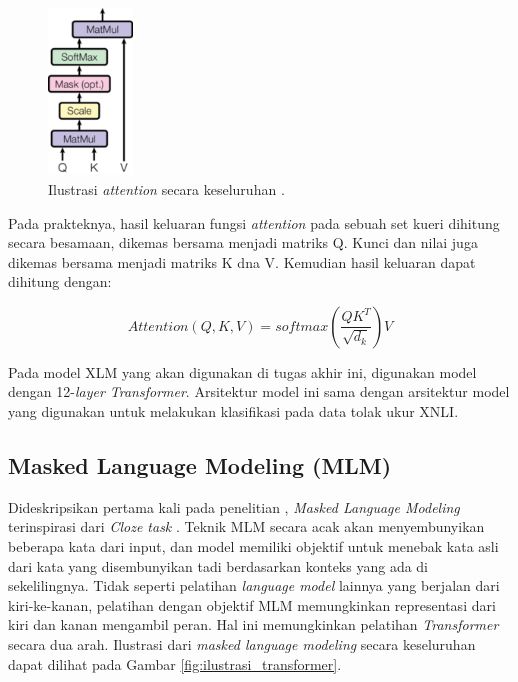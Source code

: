     \begin{figure}[ht]
        \centering
        \includegraphics[width=0.2\textwidth]{resources/overview-attention.png}
        \caption{Ilustrasi \textit{attention} secara keseluruhan \parencite{AttentionVaswani2017}.}
        \label{fig:ilustrasi_attention}
    \end{figure}

    Pada prakteknya, hasil keluaran fungsi \textit{attention} pada sebuah set kueri dihitung secara besamaan, dikemas bersama menjadi matriks Q. Kunci dan nilai juga dikemas bersama menjadi matriks K dna V. Kemudian hasil keluaran dapat dihitung dengan:

    \begin{equation}
        Attention(Q,K,V) = softmax(\frac{QK^{T}}{\sqrt{d_k}})V
    \end{equation}

    Pada model XLM yang akan digunakan di tugas akhir ini, digunakan model dengan 12-\textit{layer Transformer}. Arsitektur model ini sama dengan arsitektur model yang digunakan \parencite{LampleConneau2019} untuk melakukan klasifikasi pada data tolak ukur XNLI.

    \subsection{Masked Language Modeling (MLM)}
    Dideskripsikan pertama kali pada penelitian \parencite{Devlin_Chang_Lee_Toutanova_2019}, \textit{Masked Language Modeling} terinspirasi dari \textit{Cloze task} \parencite{Taylor_1953}. Teknik MLM secara acak akan menyembunyikan beberapa kata dari input, dan model memiliki objektif untuk menebak kata asli dari kata yang disembunyikan tadi berdasarkan konteks yang ada di sekelilingnya. Tidak seperti pelatihan \textit{language model} lainnya yang berjalan dari kiri-ke-kanan, pelatihan dengan objektif MLM memungkinkan representasi dari kiri dan kanan mengambil peran. Hal ini memungkinkan pelatihan \textit{Transformer} secara dua arah. Ilustrasi dari \textit{masked language modeling} secara keseluruhan dapat dilihat pada Gambar \ref{fig:ilustrasi_transformer}.

